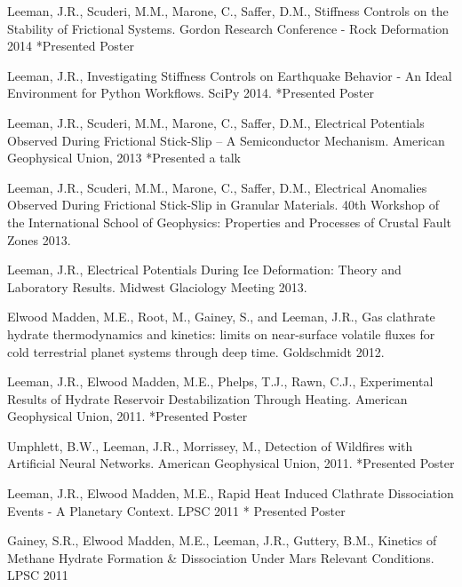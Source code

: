\documentclass[letterpaper]{article}
\renewenvironment{itemize}{
  \begin{list}{}{
    \setlength{\leftmargin}{1.5em}
  }
}{
  \end{list}
}
\begin{document}
\begin{itemize}

\item Leeman, J.R., Scuderi, M.M., Marone, C., Saffer, D.M., Stiffness Controls on the Stability of Frictional Systems. Gordon Research Conference - Rock Deformation 2014 *Presented Poster

\item Leeman, J.R., Investigating Stiffness Controls on Earthquake Behavior - An Ideal Environment for Python Workflows. SciPy 2014. *Presented Poster

\item Leeman, J.R., Scuderi, M.M., Marone, C., Saffer, D.M., Electrical Potentials Observed During Frictional Stick-Slip – A Semiconductor Mechanism.  American Geophysical Union, 2013 *Presented a talk

\item Leeman, J.R., Scuderi, M.M., Marone, C., Saffer, D.M., Electrical Anomalies Observed During Frictional Stick-Slip in Granular Materials.  40th Workshop of the International School of Geophysics: Properties and Processes of Crustal Fault Zones 2013.

\item Leeman, J.R., Electrical Potentials During Ice Deformation: Theory and Laboratory Results.  Midwest Glaciology Meeting 2013.  

\item Elwood Madden, M.E., Root, M., Gainey, S., and Leeman, J.R., Gas clathrate hydrate thermodynamics and kinetics: limits on near-surface volatile fluxes for cold terrestrial planet systems through deep time.  Goldschmidt 2012.

\item Leeman, J.R., Elwood Madden, M.E., Phelps, T.J., Rawn, C.J.,  Experimental Results of Hydrate Reservoir Destabilization Through Heating. American Geophysical Union, 2011.  *Presented Poster

\item Umphlett, B.W., Leeman, J.R., Morrissey, M.,  Detection of Wildfires with Artificial Neural Networks. American Geophysical Union, 2011.  *Presented Poster

\item Leeman, J.R., Elwood Madden, M.E., Rapid Heat Induced Clathrate Dissociation Events - A Planetary Context. LPSC 2011 * Presented Poster

\item  Gainey, S.R., Elwood Madden, M.E., Leeman, J.R., Guttery, B.M., Kinetics of Methane Hydrate Formation \& Dissociation Under Mars Relevant Conditions. LPSC 2011 


\end{itemize}
\end{document}
